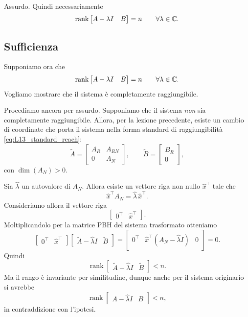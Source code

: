 Assurdo.  
Quindi necessariamente
\[
\operatorname{rank}
\begin{bmatrix}
A-\lambda I & B
\end{bmatrix}=n
\qquad \forall \lambda\in\mathbb{C}.
\]

\subsection{Sufficienza}

Supponiamo ora che
\[
\operatorname{rank}
\begin{bmatrix}
A-\lambda I & B
\end{bmatrix}=n
\qquad \forall \lambda\in\mathbb{C}.
\]
Vogliamo mostrare che il sistema è completamente raggiungibile.

Procediamo ancora per assurdo. Supponiamo che il sistema \emph{non} sia completamente raggiungibile.  
Allora, per la lezione precedente, esiste un cambio di coordinate che porta il sistema nella forma standard di raggiungibilità \eqref{eq:L13_standard_reach}:
\[
\tilde A=
\begin{bmatrix}
A_R & A_{RN}\\
0 & A_N
\end{bmatrix},
\qquad
\tilde B=
\begin{bmatrix}
B_R\\
0
\end{bmatrix},
\]
con \(\dim(A_N)>0\).

Sia \(\hat\lambda\) un autovalore di \(A_N\).  
Allora esiste un vettore riga non nullo \(\hat x^\top\) tale che
\[
\hat x^\top A_N=\hat\lambda\,\hat x^\top.
\]
Consideriamo allora il vettore riga
\[
\begin{bmatrix}
0^\top & \hat x^\top
\end{bmatrix}.
\]
Moltiplicandolo per la matrice PBH del sistema trasformato otteniamo
\[
\begin{bmatrix}
0^\top & \hat x^\top
\end{bmatrix}
\begin{bmatrix}
\tilde A-\hat\lambda I & \tilde B
\end{bmatrix}
=
\begin{bmatrix}
0^\top & \hat x^\top(A_N-\hat\lambda I) & 0
\end{bmatrix}
=0.
\]
Quindi
\[
\operatorname{rank}
\begin{bmatrix}
\tilde A-\hat\lambda I & \tilde B
\end{bmatrix}<n.
\]
Ma il rango è invariante per similitudine, dunque anche per il sistema originario si avrebbe
\[
\operatorname{rank}
\begin{bmatrix}
A-\hat\lambda I & B
\end{bmatrix}<n,
\]
in contraddizione con l’ipotesi.

